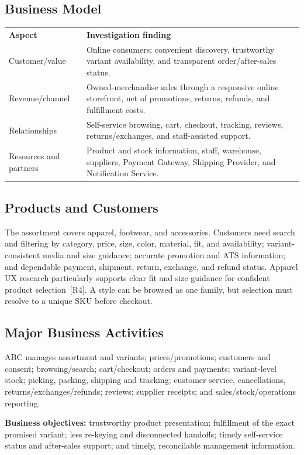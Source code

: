 \documentclass[10pt,a4paper]{article}
\begin{document}
\subsection{Business Model}
\begin{tabularx}{\textwidth}{L{30mm}Y}
\textbf{Aspect} & \textbf{Investigation finding}\\
Customer/value & Online consumers; convenient discovery, trustworthy variant availability, and transparent order/after-sales status.\\
Revenue/channel & Owned-merchandise sales through a responsive online storefront, net of promotions, returns, refunds, and fulfillment costs.\\
Relationships & Self-service browsing, cart, checkout, tracking, reviews, returns/exchanges, and staff-assisted support.\\
Resources and partners & Product and stock information, staff, warehouse, suppliers, Payment Gateway, Shipping Provider, and Notification Service.\\
\end{tabularx}

\subsection{Products and Customers}
The assortment covers apparel, footwear, and accessories. Customers need search and filtering by category, price, size, color, material, fit, and availability; variant-consistent media and size guidance; accurate promotion and ATS information; and dependable payment, shipment, return, exchange, and refund status. Apparel UX research particularly supports clear fit and size guidance for confident product selection~[R4]. A style can be browsed as one family, but selection must resolve to a unique SKU before checkout.

\subsection{Major Business Activities}
ABC manages assortment and variants; prices/promotions; customers and consent; browsing/search; cart/checkout; orders and payments; variant-level stock; picking, packing, shipping and tracking; customer service, cancellations, returns/exchanges/refunds; reviews; supplier receipts; and sales/stock/operations reporting.

\textbf{Business objectives:} trustworthy product presentation; fulfillment of the exact promised variant; less re-keying and disconnected handoffs; timely self-service status and after-sales support; and timely, reconcilable management information.
\end{document}
